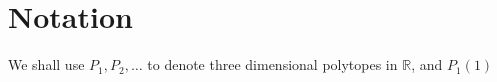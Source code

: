 \section{Notation}
We shall use $P_1, P_2, \ldots$ to denote three dimensional
polytopes in $\mathbb{R}$, and $P_1(1)$
